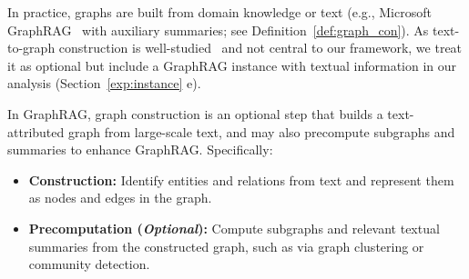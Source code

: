 In practice, graphs are built from domain knowledge
or text (e.g., Microsoft GraphRAG~\cite{GraphRAG} with auxiliary summaries; see Definition~\ref{def:graph_con}). As text-to-graph construction is well-studied~\cite{GraphRAG,LightRAG,KAG,ref:hipporag,sac-kg} and not central to our framework, we treat it as optional but include a GraphRAG instance with textual information in our analysis (Section~\ref{exp:instance} e).



\begin{definition}
\label{def:graph_con}
In GraphRAG, graph construction is an optional step that builds a text-attributed graph from large-scale text,  and may also precompute subgraphs and summaries to enhance GraphRAG.
Specifically:
\begin{itemize}[leftmargin=10pt]
    \item \textbf{Construction:} Identify entities and relations from text and represent them as nodes and edges in the graph.

    \item \textbf{Precomputation ({\it Optional}):} Compute subgraphs and relevant textual summaries from the constructed graph, such as via graph clustering or community detection. 
\end{itemize}
\end{definition}


